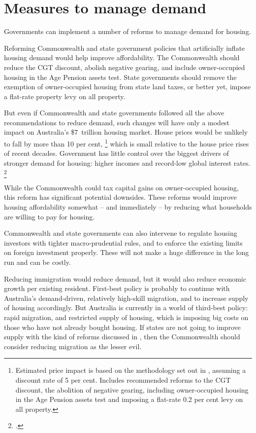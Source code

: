 \chapter{Measures to manage demand}\label{chap:measures-to-manage-demand}

Governments can implement a number of reforms to manage demand for housing.

Reforming Commonwealth and state government policies that artificially inflate housing demand would help improve affordability.
The Commonwealth should reduce the CGT discount, abolish negative gearing, and include owner-occupied housing in the Age Pension assets test.
State governments should remove the exemption of owner-occupied housing from state land taxes, or better yet, impose a flat-rate property levy on all property.

But even if Commonwealth and state governments followed all the above recommendations to reduce demand, such changes will have only a modest impact on Australia's \$7~trillion housing market.
House prices would be unlikely to fall by more than 10 per cent,%
	\footnote{Estimated price impact is based on the methodology set out in \textcite[][Box~6]{DaleyWood2016-Negative-Gearing-CGT}, assuming a discount rate of 5 per cent. Includes recommended reforms to the CGT discount, the abolition of negative gearing,  including owner-occupied housing in the Age Pension assets test and imposing a flat-rate 0.2 per cent levy on all property.}
which is small relative to the house price rises of recent decades.
Government has little control over the biggest drivers of stronger demand for housing: higher incomes and record-low global interest rates.%
	\footcite{SecularDrivers2015}

While the Commonwealth could tax capital gains on owner-occupied housing, this reform has significant potential downsides. These reforms would improve housing affordability somewhat -- and immediately -- by reducing what households are willing to pay for housing.

Commonwealth and state governments can also intervene to regulate housing investors with tighter macro-prudential rules, and to enforce the existing limits on foreign investment properly.
These will not make a huge difference in the long run and can be costly.

Reducing immigration would reduce demand, but it would also reduce economic growth per existing resident.
First-best policy is probably to continue with Australia's demand-driven, relatively high-skill migration, and to increase supply of housing accordingly.
But Australia is currently in a world of third-best policy: rapid migration, and restricted supply of housing, which is imposing big costs on those who have not already bought housing.
If states are not going to improve supply with the kind of reforms discussed in , then the Commonwealth should consider reducing migration as the lesser evil.


